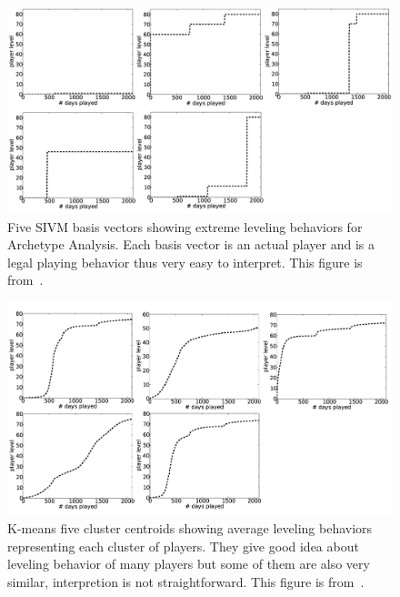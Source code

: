 \begin{figure}[here]
\centerline{\includegraphics[width=1.0\textwidth]{Figures/sivmbasis.png}}
\caption{Five SIVM basis vectors showing extreme leveling behaviors for Archetype Analysis. Each basis vector is an actual player and is a legal playing behavior thus very easy to interpret. This figure is from~\citep{Drachen:2013}.}
\label{fig:sivmbasis}
\end{figure}


\begin{figure}[here]
\centerline{\includegraphics[width=1.0\textwidth]{Figures/kmeansbasis.png}}
\caption{K-means five cluster centroids showing average leveling behaviors representing each cluster of players. They give good idea about leveling behavior of many players but some of them are also very similar, interpretion is not straightforward. This figure is from~\citep{Drachen:2013}. }
\label{fig:kmeansbasis}
\end{figure}


